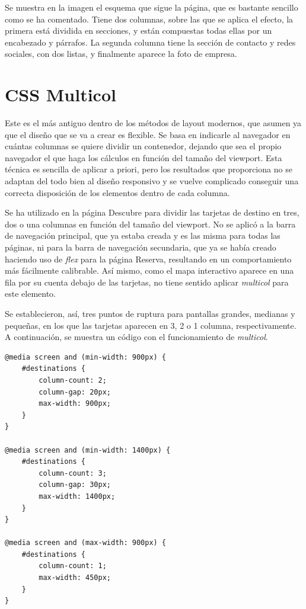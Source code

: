 \documentclass[11pt, a4paper]{book}
\begin{document}
	Se muestra en la imagen el esquema que sigue la página, que es bastante sencillo como se ha comentado. Tiene dos columnas, sobre las que se aplica el efecto, la primera está dividida en secciones, y están compuestas todas ellas por un encabezado y párrafos. La segunda columna tiene la sección de contacto y redes sociales, con dos listas, y finalmente aparece la foto de empresa.

	
	\section{CSS Multicol}

    Este es el más antiguo dentro de los métodos de layout modernos, que asumen ya que el diseño que se va a crear es flexible. Se basa en indicarle al navegador en cuántas columnas se quiere dividir un contenedor, dejando que sea el propio navegador el que haga los cálculos en función del tamaño del viewport. Esta técnica es sencilla de aplicar a priori, pero los resultados que proporciona no se adaptan del todo bien al diseño responsivo y se vuelve complicado conseguir una correcta disposición de los elementos dentro de cada columna.

    Se ha utilizado en la página Descubre para dividir las tarjetas de destino en tres, dos o una columnas en función del tamaño del viewport. No se aplicó a la barra de navegación principal, que ya estaba creada y es las misma para todas las páginas, ni para la barra de navegación secundaria, que ya se había creado haciendo uso de \textit{flex} para la página Reserva, resultando en un comportamiento más fácilmente calibrable. Así mismo, como el mapa interactivo aparece en una fila por su cuenta debajo de las tarjetas, no tiene sentido aplicar \textit{multicol} para este elemento.

    Se establecieron, así, tres puntos de ruptura para pantallas grandes, medianas y pequeñas, en los que las tarjetas aparecen en 3, 2 o 1 columna, respectivamente. A continuación, se muestra un código con el funcionamiento de \textit{multicol}.	

	\begin{lstlisting}[]
@media screen and (min-width: 900px) {
    #destinations {
        column-count: 2;
        column-gap: 20px;
        max-width: 900px;
    }
}

@media screen and (min-width: 1400px) {
    #destinations {
        column-count: 3;
        column-gap: 30px;
        max-width: 1400px;
    }
}

@media screen and (max-width: 900px) {
    #destinations {
        column-count: 1;
        max-width: 450px;
    }
}
	\end{lstlisting}
\end{document}

